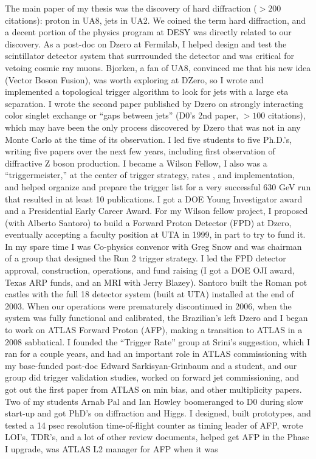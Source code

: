 
\vspace*{0.2in}
\vspace*{0.1in}

 The main paper of my thesis was the discovery of hard diffraction ($>200$ citations): proton in UA8, jets in UA2.  We coined the term hard diffraction, and a decent portion of the physics program at DESY was directly related to our discovery.   As a post-doc on Dzero at Fermilab, I helped design and test the scintillator detector system that surrrounded the detector and was critical for vetoing cosmic ray muons. Bjorken, a fan of UA8, convinced me that his new idea  (Vector Boson Fusion),  was worth exploring at DZero, so I wrote and implemented a topological trigger algorithm to look for jets with a large eta separation.   I wrote the second paper published by Dzero on strongly interacting color singlet exchange or ``gaps between jets''  (D0's 2nd paper, $>100$ citations), which may have been the only process discovered by Dzero that was not in any Monte Carlo at the time of its observation. I led five students to five Ph.D.'s, writing five papers  over the next few years, including first observation of diffractive Z boson production.  I became a Wilson Fellow, I also was a ``triggermeister,''  at the center of trigger strategy, rates , and implementation,  and helped organize and prepare the trigger list for  a very successful 630 GeV run that resulted in at least 10 publications.  I got a  DOE Young Investigator award and a Presidential Early Career Award. For my Wilson fellow project,  I proposed (with Alberto Santoro) to build a Forward Proton Detector (FPD) at Dzero,  eventually accepting a faculty position at  UTA in 1999, in part to try to fund it.  In my spare time I was Co-physics convenor with Greg Snow and was chairman of a group that designed the  Run 2 trigger strategy.  I led  the FPD detector approval, construction, operations, and fund raising (I got a DOE OJI award,  Texas ARP funds,  and an MRI with Jerry Blazey). Santoro built the Roman pot castles  with the full 18 detector system (built at UTA) installed at the end of 2003.  When our operations were prematurely discontinued in 2006, when the system was fully functional and calibrated, the Brazilian's left Dzero  and I began to work on ATLAS Forward Proton (AFP), making a transition to ATLAS in a 2008 sabbatical. I founded the  ``Trigger Rate'' group at Srini's suggestion,  which I ran for a couple years, and had an important role in ATLAS commissioning with my base-funded post-doc Edward Sarkisyan-Grinbaum and a student, and our group did trigger validation studies, worked on forward jet commissioning,  and got out the first paper from ATLAS on min bias,  and other multiplicity papers.  Two of my students Arnab Pal and Ian Howley  boomeranged to D0  during slow start-up and got PhD's on diffraction and Higgs.  I designed, built prototypes, and tested a 14 psec resolution time-of-flight counter as timing leader of AFP, wrote LOI's, TDR's, and a lot of other review documents, helped get AFP in the Phase I upgrade, was ATLAS L2 manager for AFP when it was 